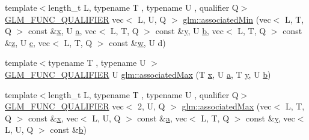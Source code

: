\begin{DoxyCompactItemize}
{\footnotesize template$<$length\+\_\+t L, typename T , typename U , qualifier Q$>$ }\\\mbox{\hyperlink{setup_8hpp_a33fdea6f91c5f834105f7415e2a64407}{G\+L\+M\+\_\+\+F\+U\+N\+C\+\_\+\+Q\+U\+A\+L\+I\+F\+I\+ER}} vec$<$ L, U, Q $>$ \mbox{\hyperlink{group__gtx__associated__min__max_ga2db7e351994baee78540a562d4bb6d3b}{glm\+::associated\+Min}} (vec$<$ L, T, Q $>$ const \&\mbox{\hyperlink{_s_d_l__opengl_8h_ad0e63d0edcdbd3d79554076bf309fd47}{x}}, U \mbox{\hyperlink{_s_d_l__opengl__glext_8h_a3309789fc188587d666cda5ece79cf82}{a}}, vec$<$ L, T, Q $>$ const \&\mbox{\hyperlink{_s_d_l__opengl_8h_a1675d9d7bb68e1657ff028643b4037e3}{y}}, U \mbox{\hyperlink{_s_d_l__opengl__glext_8h_a0f71581a41fd2264c8944126dabbd010}{b}}, vec$<$ L, T, Q $>$ const \&\mbox{\hyperlink{_s_d_l__opengl__glext_8h_a5e74030ebb3297ce1b37ff716fedd68f}{z}}, U \mbox{\hyperlink{_s_d_l__opengl__glext_8h_a1f2d7f8147412c43ba2303a56f97ee73}{c}}, vec$<$ L, T, Q $>$ const \&\mbox{\hyperlink{_s_d_l__opengl__glext_8h_a6ee8f168a7ab6785a9bb57c6715dad99}{w}}, U d)
\item 
{\footnotesize template$<$typename T , typename U $>$ }\\\mbox{\hyperlink{setup_8hpp_a33fdea6f91c5f834105f7415e2a64407}{G\+L\+M\+\_\+\+F\+U\+N\+C\+\_\+\+Q\+U\+A\+L\+I\+F\+I\+ER}} U \mbox{\hyperlink{group__gtx__associated__min__max_ga7d9c8785230c8db60f72ec8975f1ba45}{glm\+::associated\+Max}} (T \mbox{\hyperlink{_s_d_l__opengl_8h_ad0e63d0edcdbd3d79554076bf309fd47}{x}}, U \mbox{\hyperlink{_s_d_l__opengl__glext_8h_a3309789fc188587d666cda5ece79cf82}{a}}, T \mbox{\hyperlink{_s_d_l__opengl_8h_a1675d9d7bb68e1657ff028643b4037e3}{y}}, U \mbox{\hyperlink{_s_d_l__opengl__glext_8h_a0f71581a41fd2264c8944126dabbd010}{b}})
\item 
{\footnotesize template$<$length\+\_\+t L, typename T , typename U , qualifier Q$>$ }\\\mbox{\hyperlink{setup_8hpp_a33fdea6f91c5f834105f7415e2a64407}{G\+L\+M\+\_\+\+F\+U\+N\+C\+\_\+\+Q\+U\+A\+L\+I\+F\+I\+ER}} vec$<$ 2, U, Q $>$ \mbox{\hyperlink{group__gtx__associated__min__max_ga5c6758bc50aa7fbe700f87123a045aad}{glm\+::associated\+Max}} (vec$<$ L, T, Q $>$ const \&\mbox{\hyperlink{_s_d_l__opengl_8h_ad0e63d0edcdbd3d79554076bf309fd47}{x}}, vec$<$ L, U, Q $>$ const \&\mbox{\hyperlink{_s_d_l__opengl__glext_8h_a3309789fc188587d666cda5ece79cf82}{a}}, vec$<$ L, T, Q $>$ const \&\mbox{\hyperlink{_s_d_l__opengl_8h_a1675d9d7bb68e1657ff028643b4037e3}{y}}, vec$<$ L, U, Q $>$ const \&\mbox{\hyperlink{_s_d_l__opengl__glext_8h_a0f71581a41fd2264c8944126dabbd010}{b}})

\end{DoxyCompactItemize}
